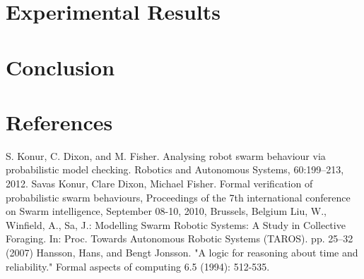 \documentclass[11pt]{article}
\theoremstyle{definition}
\begin{document}
\section{Experimental Results}
\label{sec:results}

\section{Conclusion}
\label{sec:conclusion}

\section{References}

\begin{thebibliography}{99}
        S. Konur, C. Dixon, and M. Fisher.
        Analysing robot swarm behaviour via
        probabilistic model checking.
        Robotics and Autonomous Systems, 60:199–213,
        2012.
        Savas Konur, Clare Dixon, Michael Fisher.
        Formal verification of probabilistic swarm behaviours,
        Proceedings of the 7th international conference on Swarm intelligence,
        September 08-10, 2010, Brussels, Belgium
        Liu, W., Winfield, A., Sa, J.: Modelling Swarm Robotic Systems: A Study in Collective
        Foraging. In: Proc. Towards Autonomous Robotic Systems (TAROS). pp. 25–32 (2007)
        Hansson, Hans, and Bengt Jonsson. "A logic for reasoning about time and reliability." Formal aspects of computing 6.5 (1994): 512-535.
\end{thebibliography}
\end{document}
